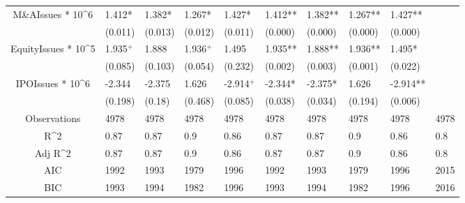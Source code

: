 \documentclass{article}
\begin{document}
\begin{table}[H]
\begin{tabular}{|clllllllll|}
  M\&AIssues * 10^6 & 1.412* & 1.382* & 1.267* & 1.427* & 1.412** & 1.382** & 1.267** & 1.427** &  \\ 
   & (0.011) & (0.013) & (0.012) & (0.011) & (0.000) & (0.000) & (0.000) & (0.000) &  \\ 
  EquityIssues * 10^5 & 1.935$^{+}$ & 1.888 & 1.936$^{+}$ & 1.495 & 1.935** & 1.888** & 1.936** & 1.495* &  \\ 
   & (0.085) & (0.103) & (0.054) & (0.232) & (0.002) & (0.003) & (0.001) & (0.022) &  \\ 
  IPOIssues * 10^6 & -2.344 & -2.375 & 1.626 & -2.914$^{+}$ & -2.344* & -2.375* & 1.626 & -2.914** &  \\ 
   & (0.198) & (0.18) & (0.468) & (0.085) & (0.038) & (0.034) & (0.194) & (0.006) &  \\ 
  \hline 
 Observations & 4978 & 4978 & 4978 & 4978 & 4978 & 4978 & 4978 & 4978 & 4978 \\ 
  R^2 & 0.87 & 0.87 & 0.9 & 0.86 & 0.87 & 0.87 & 0.9 & 0.86 & 0.8 \\ 
  Adj R^2 & 0.87 & 0.87 & 0.9 & 0.86 & 0.87 & 0.87 & 0.9 & 0.86 & 0.8 \\ 
  AIC & 1992 & 1993 & 1979 & 1996 & 1992 & 1993 & 1979 & 1996 & 2015 \\ 
  BIC & 1993 & 1994 & 1982 & 1996 & 1993 & 1994 & 1982 & 1996 & 2016 \\ 
   \hline
\end{tabular}
 
\end{table}
\end{document}
